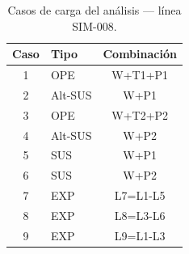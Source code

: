 \begin{table}[htbp]
  \centering
  \small
  \caption{Casos de carga del análisis — línea SIM-008.}
  \label{tab:casos}
  \begin{tabular}{clc}
    \toprule
    Caso & Tipo & Combinaci\'on \\
    \midrule
    1 & OPE & W+T1+P1 \\
    2 & Alt-SUS & W+P1 \\
    3 & OPE & W+T2+P2 \\
    4 & Alt-SUS & W+P2 \\
    5 & SUS & W+P1 \\
    6 & SUS & W+P2 \\
    7 & EXP & L7=L1-L5 \\
    8 & EXP & L8=L3-L6 \\
    9 & EXP & L9=L1-L3 \\
    \bottomrule
  \end{tabular}
\end{table}
